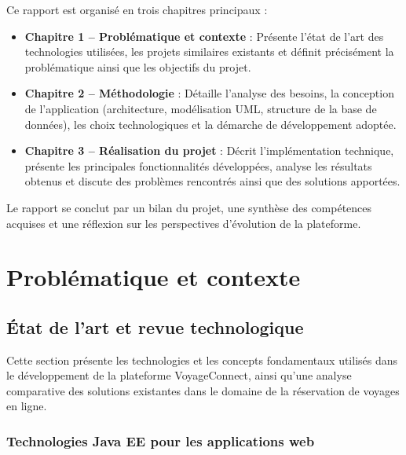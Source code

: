 \documentclass[12pt,a4paper]{report}
\begin{document}
Ce rapport est organisé en trois chapitres principaux :

\begin{itemize}
    \item \textbf{Chapitre 1 -- Problématique et contexte} : Présente l'état de l'art des technologies utilisées, les projets similaires existants et définit précisément la problématique ainsi que les objectifs du projet.
    
    \item \textbf{Chapitre 2 -- Méthodologie} : Détaille l'analyse des besoins, la conception de l'application (architecture, modélisation UML, structure de la base de données), les choix technologiques et la démarche de développement adoptée.
    
    \item \textbf{Chapitre 3 -- Réalisation du projet} : Décrit l'implémentation technique, présente les principales fonctionnalités développées, analyse les résultats obtenus et discute des problèmes rencontrés ainsi que des solutions apportées.
\end{itemize}

\vspace{0.5cm}

Le rapport se conclut par un bilan du projet, une synthèse des compétences acquises et une réflexion sur les perspectives d'évolution de la plateforme.

\clearpage



\chapter{Problématique et contexte}

\section{État de l'art et revue technologique}

Cette section présente les technologies et les concepts fondamentaux utilisés dans le développement de la plateforme VoyageConnect, ainsi qu'une analyse comparative des solutions existantes dans le domaine de la réservation de voyages en ligne.

\subsection{Technologies Java EE pour les applications web}
\end{document}

